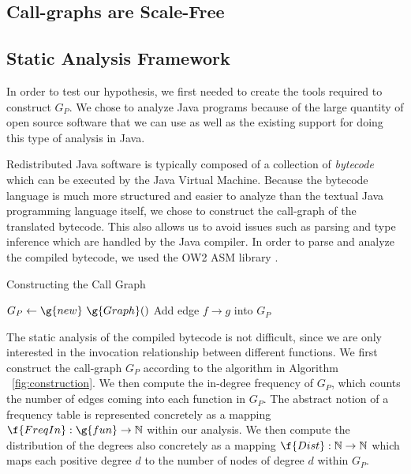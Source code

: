 \documentclass[11pt,a4paper,twocolumn]{article}
\begin{document}
\begin{singlespace}
\section{Call-graphs are Scale-Free}
\subsection{Static Analysis Framework}

In order to test our hypothesis, we first needed to create the tools required
to construct $G_P$. We chose to analyze Java programs because of the large
quantity of open source software that we can use as well as the existing
support for doing this type of analysis in Java.

Redistributed Java software is typically composed of a collection of
\emph{bytecode} which can be executed by the Java Virtual Machine. Because the
bytecode language is much more structured and easier to analyze than the
textual Java programming language itself, we chose to construct the call-graph
of the translated bytecode. This also allows us to avoid issues such as
parsing and type inference which are handled by the Java compiler. In order
to parse and analyze the compiled bytecode, we used the OW2 ASM library
\cite{ocwasm}.

\begin{algorithm}
\caption{Constructing the Call Graph}
\begin{algorithmic}
\State $G_P \gets \g{new}~ \g{Graph}()$
\State Add edge $f \to g$ into $G_P$
\EndIf
\EndFor
\EndFor
\EndFunction
\end{algorithmic}
\label{fig:construction}
\end{algorithm}

The static analysis of the compiled bytecode is not difficult, since we are
only interested in the invocation relationship between different functions. We
first construct the call-graph $G_P$ according to the algorithm in Algorithm
~\ref{fig:construction}. We then compute the in-degree frequency of $G_P$,
which counts the number of edges coming into each function in $G_P$. The
abstract notion of a frequency table is represented concretely as a mapping
$\f{FreqIn}:\g{fun}\to\mathbb{N}$ within our analysis. We then compute the
distribution of the degrees also concretely as a mapping $\f{Dist}:\mathbb{N}
\to\mathbb{N}$ which maps each positive degree $d$ to the number of nodes of
degree $d$ within $G_P$.


\end{singlespace}
\end{document}
